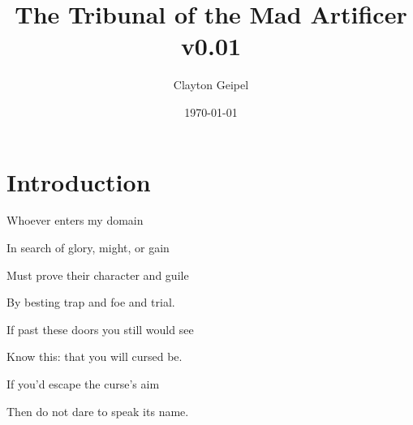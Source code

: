 \documentclass[letterpaper,twocolumn,openany,nodeprecatedcode]{dndbook}
\title{The Tribunal of the Mad Artificer \\
\large v0.01}
\author{Clayton Geipel}
\date{\today}
\begin{document}
\frontmatter

\maketitle

\tableofcontents

\mainmatter%

\chapter*{Introduction}


\begin{DndReadAloud}

Whoever enters my domain

In search of glory, might, or gain

Must prove their character and guile

By besting trap and foe and trial.

If past these doors you still would see

Know this: that you will cursed be.

If you'd escape the curse's aim
    
Then do not dare to speak its name.
\end{DndReadAloud}
\end{document}
